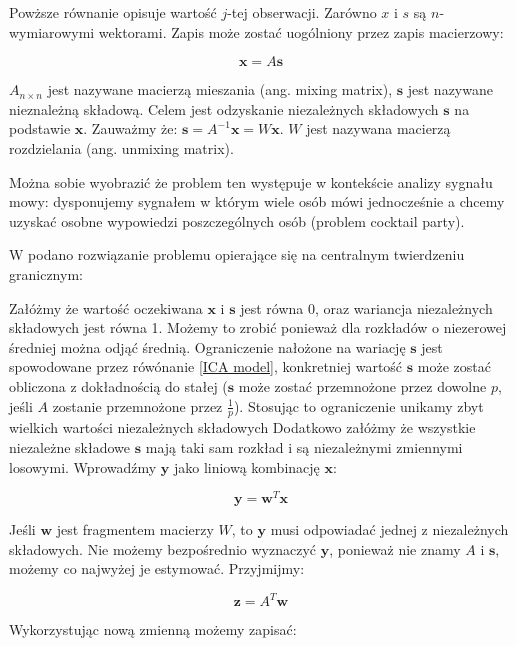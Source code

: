 \documentclass[oneside, eng]{mgr}
\newcommand{\bb}{\textbf}
\begin{document}
Powższe równanie opisuje wartość $j$-tej obserwacji. Zarówno $x$ i $s$ są $n$-wymiarowymi wektorami. Zapis może zostać uogólniony przez zapis macierzowy:

\begin{equation}
	\bb{x} = A \bb{s}
	\label{ICA model}
\end{equation}

$A_{n \times n}$ jest nazywane macierzą mieszania (ang. mixing matrix), $\bb{s}$ jest nazywane nieznależną składową. Celem jest odzyskanie niezależnych składowych $\bb{s}$ na podstawie $\bb{x}$. Zauważmy że: $\bb{s} = A^{-1}\bb{x} = W \bb{x}$. $W$ jest nazywana macierzą rozdzielania (ang. unmixing matrix). 

Można sobie wyobrazić że problem ten występuje w kontekście analizy sygnału mowy: dysponujemy sygnałem w którym wiele osób mówi jednocześnie a chcemy uzyskać osobne wypowiedzi poszczególnych osób (problem cocktail party). 

W \cite{ICA} podano rozwiązanie problemu opierające się na centralnym twierdzeniu granicznym:

Załóżmy że wartość oczekiwana $\bb{x}$ i $\bb{s}$ jest równa 0, oraz wariancja niezależnych składowych jest równa 1. Możemy to zrobić ponieważ dla rozkładów o niezerowej średniej można odjąć średnią. Ograniczenie nałożone na wariację $\bb{s}$ jest spowodowane przez rówónanie \ref{ICA model}, konkretniej wartość $\bb{s}$ może zostać obliczona z dokładnością do stałej ($\bb{s}$ może zostać przemnożone przez dowolne $p$, jeśli $A$ zostanie przemnożone przez $\frac{1}{p}$). Stosując to ograniczenie unikamy zbyt wielkich wartości niezależnych składowych  Dodatkowo załóżmy że wszystkie niezależne składowe $\bb{s}$ mają taki sam rozkład i są niezależnymi zmiennymi losowymi. Wprowadźmy $\bb{y}$ jako liniową kombinację $\bb{x}$:

\begin{equation}
	\bb{y} = \bb{w}^T \bb{x}
\end{equation}

Jeśli $\bb{w}$ jest fragmentem macierzy $W$, to $\bb{y}$ musi odpowiadać jednej z niezależnych składowych. Nie możemy bezpośrednio wyznaczyć $\bb{y}$, ponieważ nie znamy $A$ i $\bb{s}$, możemy co najwyżej je estymować. Przyjmijmy:

\begin{equation}
	\bb{z} = A^T \bb{w}
\end{equation}

Wykorzystując nową zmienną możemy zapisać:
\end{document}
